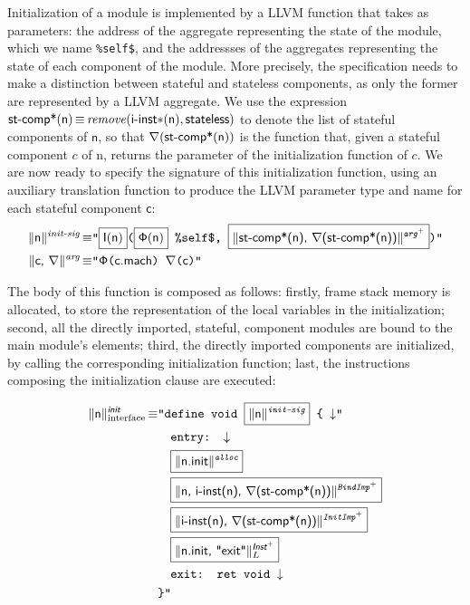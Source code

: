 \documentclass{article}
\newcommand{\trad}[2]{\ensuremath{\lVert \textsf{#1} \rVert^{\textit{#2}}}}
\newcommand{\nl}[0]{\ensuremath{\downarrow}}
\DeclareMathOperator{\isdef}{\equiv}
\newcommand{\llvm}[1]{\texttt{#1}}
\newcommand{\B}[1]{\textsf{#1}}
\newcommand{\ListOf}[1]{$\mbox{#1}^+$}
\newcommand{\PH}[1]{\framebox{$#1$}}
\newcommand{\stateless}[0]{\ensuremath{\textsf{stateless}}}
\newcommand{\importedinstances}[0]{\ensuremath{\textsf{i-inst}}}
\newcommand{\trimportedinstances}[0]{\ensuremath{\textsf{i-inst$\mathsf{\ast}$}}}
\newcommand{\stateref}[0]{\ensuremath{\sf\Phi}}
\newcommand{\self}[0]{\llvm{\%self\$}}
\newcommand{\init}[0]{\ensuremath{\mathsf{I}}}
\begin{document}
Initialization of a module is implemented by a LLVM function that takes as
parameters: the address of the aggregate representing the state of the module,
which we name \self, and the addressses of the aggregates representing
the state of each component of the module.  More precisely, the specification
needs to make a distinction between stateful and stateless components, as only
the former are represented by a LLVM aggregate. We use the expression
$\components(\B{n}) \isdef \mathit{remove}(\trimportedinstances(\B{n}),
\stateless)$ to denote the list of stateful components of $\B{n}$, so that
$\argname(\components(\B{n}))$ is the function that, given a stateful component
$c$ of \B{n}, returns the parameter of the initialization function of $c$. We
are now ready to specify the signature of this initialization function, using an
auxiliary translation function to produce the LLVM parameter type and name for
each stateful component $\B{c}$:
\begin{align*}
\trad{\B{n}}{init-sig} \isdef &
\llvm{"\PH{\init(\B{n})}(\PH{\stateref(\B{n})} \self, 
  \PH{\trad{\components(\B{n}), \argname(\components(\B{n}))}{\ListOf{arg}}})"} \\
\trad{\B{c}, \argname}{arg} \isdef & \llvm{"\stateref(\B{c.mach}) \argname(\B{c})"}
\end{align*}

The body of this function is composed as follows: firstly, frame stack memory is
allocated, to store the representation of the local variables in the
initialization; second, all the directly imported, stateful, component modules
are bound to the main module's elements; third, the directly imported components
are initialized, by calling the corresponding initialization function; last, the
instructions composing the initialization clause are executed:

\begin{align*}
  \trad{\B{n}}{\B{init}}_{\text{interface}} \isdef
  & \llvm{"define void \PH{\trad{\B{n}}{init-sig}} \{ \nl"} \\
  & \quad\llvm{entry: \nl} \\
  & \quad\llvm{\PH{\trad{n.init}{alloc}}} \\
  & \quad\llvm{\PH{\trad{n, \importedinstances(n), \argname(\components(\B{n}))}{\ListOf{BindImp}}}} \\
  & \quad\llvm{\PH{\trad{\importedinstances(n), \argname(\components(\B{n}))}{\ListOf{InitImp}}}} \\
  & \quad\llvm{\PH{\trad{n.init, "exit"}{\ListOf{\B{Inst}}}_L}} \\
  & \quad\llvm{exit: ret void \nl} \\
  & \llvm{\}"}
\end{align*}
\end{document}

